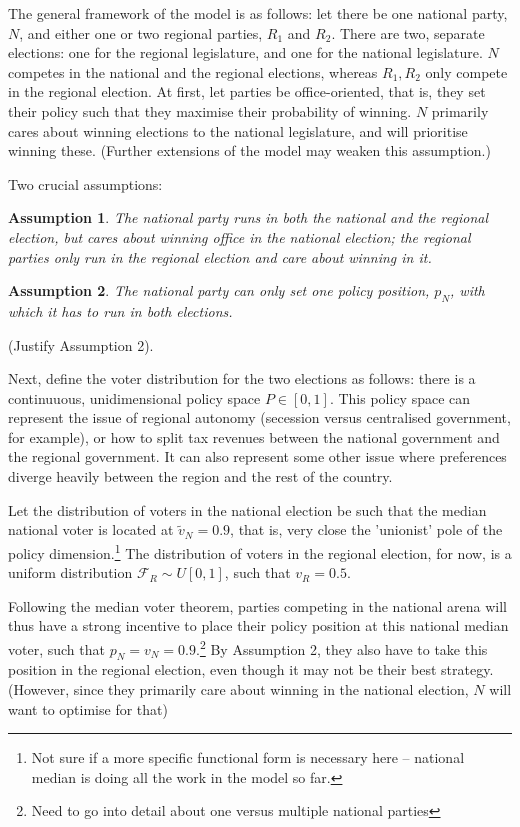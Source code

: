 \documentclass[11pt]{article}
\newtheorem{assumption}{Assumption}
\begin{document}
The general framework of the model is as follows: let there be one national party, $N$, and either one or two regional parties, $R_1$ and $R_2$. There are two, separate elections: one for the regional legislature, and one for the national legislature. $N$ competes in the national and the regional elections, whereas $R_1, R_2$ only compete in the regional election. At first, let parties be office-oriented, that is, they set their policy such that they maximise their probability of winning. $N$ primarily cares about winning elections to the national legislature, and will prioritise winning these. (Further extensions of the model may weaken this assumption.)

Two crucial assumptions:
\begin{assumption}
    The national party runs in both the national and the regional election, but cares about winning office in the national election; the regional parties only run in the regional election and care about winning in it.
\end{assumption}
\begin{assumption}
    The national party can only set one policy position, $p_N$, with which it has to run in both elections.
\end{assumption}

(Justify Assumption 2).

Next, define the voter distribution for the two elections as follows: there is a continuuous, unidimensional policy space $P \in [0, 1]$. This policy space can represent the issue of regional autonomy (secession versus centralised government, for example), or how to split tax revenues between the national government and the regional government. It can also represent some other issue where preferences diverge heavily between the region and the rest of the country.

Let the distribution of voters in the national election be such that the median national voter is located at $\tilde{v}_N = 0.9$, that is, very close the 'unionist' pole of the policy dimension.\footnote{Not sure if a more specific functional form is necessary here -- national median is doing all the work in the model so far.} The distribution of voters in the regional election, for now, is a uniform distribution $\mathcal{F}_R \sim U[0, 1]$, such that $v_R = 0.5$.

Following the median voter theorem, parties competing in the national arena will thus have a strong incentive to place their policy position at this national median voter, such that $p_N = v_N = 0.9$.\footnote{Need to go into detail about one versus multiple national parties} By Assumption 2, they also have to take this position in the regional election, even though it may not be their best strategy. (However, since they primarily care about winning in the national election, $N$ will want to optimise for that)
\end{document}

